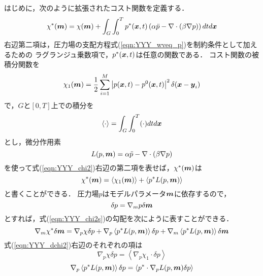 はじめに，次のように拡張されたコスト関数を定義する．
\begin{equation}
	\chi^*(\mbox{\boldmath $m$})
	=
	\chi(\mbox{\boldmath $m$})
	+
	\int_G\int_0^T 
	p^*(\mbox{\boldmath $x$},t)
	\left( 
		\alpha \ddot{p}-\nabla \cdot \left(\beta  \nabla  p \right)
	\right)
	dt d\mbox{\boldmath $x$}
	\label{eqn:YYY_chi2}
\end{equation}
右辺第二項は，圧力場の支配方程式(\ref{eqn:YYY_wveq_p})を制約条件として加えるための
ラグランジュ乗数項で，$p^*(\mbox{\boldmath $x$},t)$は任意の関数である．
コスト関数の被積分関数を
\begin{equation}
	\chi_1(\mbox{\boldmath $m$})=\frac{1}{2} 
	\sum_{i=1}^M
	\left| p(\mbox{\boldmath $x$},t)-p^0(\mbox{\boldmath $x$},t)\right|^2
	\delta(\mbox{\boldmath $x$}-\mbox{\boldmath $y$}_i )
	\label{eqn:YYY_04}
\end{equation}
で，$G$と$[0,T]$上での積分を
\begin{equation}
	\left< \cdot \right>=\int_G\int_0^T (\cdot )dtd\mbox{\boldmath $x$}
	\label{eqn:YYY_05}
\end{equation}
とし，微分作用素
\begin{equation}
	L(p,\mbox{\boldmath $m$})=\alpha \ddot{p}-\nabla \cdot \left(\beta  \nabla  p \right)
	\label{eqn:YYY_06}
\end{equation}
を使って式(\ref{eqn:YYY_chi2})右辺の第二項を表せば，$\chi^*(\mbox{\boldmath $m$})$は
\begin{equation}
	\chi^*(\mbox{\boldmath $m$}) 
	=
	\left< \chi_1 (\mbox{\boldmath $m$})\right>
	+
	\left< p^* L(p,\mbox{\boldmath $m$})\right>
	\label{eqn:YYY_chi2s}
\end{equation}
と書くことができる．
圧力場$p$はモデルパラメータ$\mbox{\boldmath $m$}$に依存するので，
\begin{equation}
	\delta p= \nabla_m p \delta \mbox{\boldmath $m$}
	\label{eqn:YYY_var_p}
\end{equation}
とすれば，式(\ref{eqn:YYY_chi2s})の勾配を次にように表すことができる．
\begin{equation}
	\nabla_m \chi^* \delta \mbox{\boldmath $m$}
	=
	\nabla_p \chi \delta p
	+
	\nabla_p \left< p^*  L(p,\mbox{\boldmath $m$}) \right> \delta p
	+
	\nabla_m \left< p^*  L(p,\mbox{\boldmath $m$}) \right> \delta \mbox{\boldmath $m$}
	\label{eqn:YYY_dchi2}
\end{equation}
式(\ref{eqn:YYY_dchi2})右辺のそれぞれの項は
\begin{equation}
	\nabla_p \chi \delta p
	=  
	\left< \nabla_p \chi_1\cdot \delta p \right> 
	\label{eqn:YYY_dp1}
\end{equation}
\begin{equation}
	\nabla_p \left< p^*  L(p,\mbox{\boldmath $m$}) \right> \delta p
	=  
	\left< p^*  \cdot \nabla_p L(p,\mbox{\boldmath $m$})\delta p \right> 
	\label{eqn:YYY_dp2}
\end{equation}
